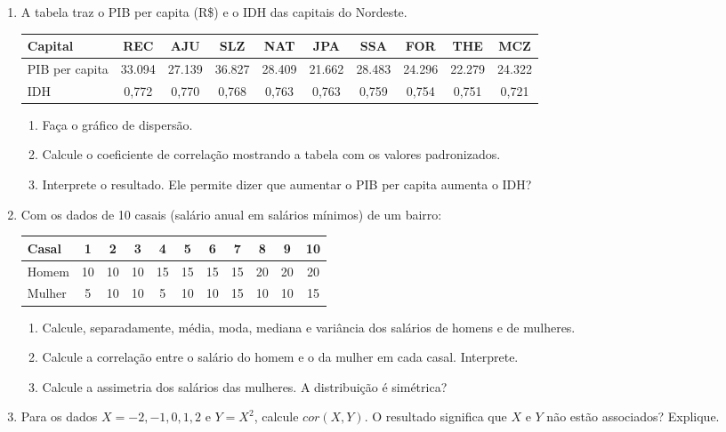 \documentclass[11pt]{article}
\begin{document}
\begin{enumerate}[label=\textbf{C\arabic*.}, leftmargin=*]
\item A tabela traz o PIB per capita (R\$) e o IDH das capitais do Nordeste.
\begin{center}
\begin{tabular}{l|ccccccccc}
\toprule
Capital & REC & AJU & SLZ & NAT & JPA & SSA & FOR & THE & MCZ \\
\midrule
PIB per capita & 33.094 & 27.139 & 36.827 & 28.409 & 21.662 & 28.483 & 24.296 & 22.279 & 24.322 \\
IDH & 0,772 & 0,770 & 0,768 & 0,763 & 0,763 & 0,759 & 0,754 & 0,751 & 0,721 \\
\bottomrule
\end{tabular}
\end{center}
\begin{enumerate}[label=(\alph*)]
  \item Faça o gráfico de dispersão.
  \item Calcule o coeficiente de correlação mostrando a tabela com os valores padronizados.
  \item Interprete o resultado. Ele permite dizer que aumentar o PIB per capita aumenta o IDH?
\end{enumerate}
\item Com os dados de 10 casais (salário anual em salários mínimos) de um bairro:
\begin{center}
\begin{tabular}{l|cccccccccc}
\toprule
Casal & 1 & 2 & 3 & 4 & 5 & 6 & 7 & 8 & 9 & 10 \\
\midrule
Homem & 10 & 10 & 10 & 15 & 15 & 15 & 15 & 20 & 20 & 20 \\
Mulher & 5 & 10 & 10 & 5 & 10 & 10 & 15 & 10 & 10 & 15 \\
\bottomrule
\end{tabular}
\end{center}
\begin{enumerate}[label=(\alph*)]
  \item Calcule, separadamente, média, moda, mediana e variância dos salários de homens e de mulheres.
  \item Calcule a correlação entre o salário do homem e o da mulher em cada casal. Interprete.
  \item Calcule a assimetria dos salários das mulheres. A distribuição é simétrica?
\end{enumerate}
\item Para os dados $X = -2, -1, 0, 1, 2$ e $Y = X^2$, calcule $cor(X, Y)$. O resultado significa que $X$ e $Y$ não estão associados? Explique.

\end{enumerate}
\end{document}
